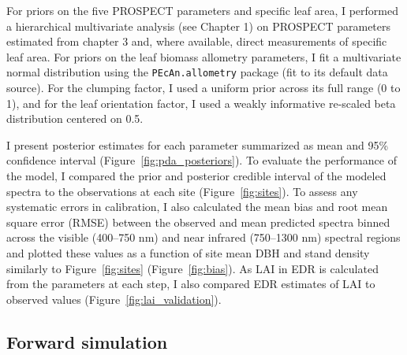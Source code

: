 For priors on the five PROSPECT parameters and specific leaf area, I performed a hierarchical multivariate analysis (see Chapter 1) on PROSPECT parameters estimated from chapter 3 and, where available, direct measurements of specific leaf area. 
For priors on the leaf biomass allometry parameters, I fit a multivariate normal distribution using the \texttt{PEcAn.allometry} package (fit to its default data source). %
% 
% 
For the clumping factor, I used a uniform prior across its full range (0 to 1), and for the leaf orientation factor, I used a weakly informative re-scaled beta distribution centered on 0.5.

I present posterior estimates for each parameter summarized as mean and 95\% confidence interval (Figure~\ref{fig:pda_posteriors}).
To evaluate the performance of the model, I compared the prior and posterior credible interval of the modeled spectra to the observations at each site (Figure~\ref{fig:sites}).
% 
% 
To assess any systematic errors in calibration, I also calculated the mean bias and root mean square error (RMSE) between the observed and mean predicted spectra binned across the visible (400--750 nm) and near infrared (750--1300 nm) spectral regions and plotted these values as a function of site mean DBH and stand density similarly to Figure~\ref{fig:sites} (Figure~\ref{fig:bias}).
As LAI in EDR is calculated from the parameters at each step, I also compared EDR estimates of LAI to observed values (Figure~\ref{fig:lai_validation}). %

\subsection{Forward simulation}

